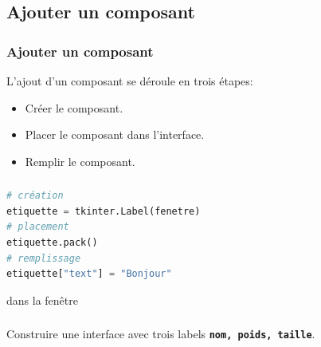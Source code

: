 \documentclass[svgnames,11pt]{beamer}
\begin{document}
\subsection{Ajouter un composant}
\begin{frame}
    \frametitle{Ajouter un composant}

    L'ajout d'un composant se déroule en trois étapes:
    \begin{itemize}
        \item Créer le composant.
        \item Placer le composant dans l'interface.
        \item Remplir le composant.
    \end{itemize}

\end{frame}
\begin{frame}[fragile]
    \frametitle{}

    \begin{center}
        \begin{lstlisting}[language=Python,basicstyle=\small]
# création
etiquette = tkinter.Label(fenetre)
# placement
etiquette.pack()
# remplissage
etiquette["text"] = "Bonjour"
\end{lstlisting}
         dans la fenêtre
        \label{label}
    \end{center}

\end{frame}
\begin{frame}
    \frametitle{}
    \begin{activite}
        Construire une interface avec trois labels \textbf{\texttt{nom, poids, taille}}.
    \end{activite}


\end{frame}
\end{document}
